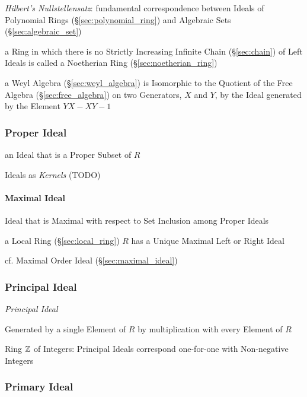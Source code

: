 \emph{Hilbert's Nullstellensatz}: fundamental correspondence between Ideals of
Polynomial Rings (\S\ref{sec:polynomial_ring}) and Algebraic Sets
(\S\ref{sec:algebraic_set})

a Ring in which there is no Strictly Increasing Infinite Chain
(\S\ref{sec:chain}) of Left Ideals is called a Noetherian Ring
(\S\ref{sec:noetherian_ring})

\fist a Weyl Algebra (\S\ref{sec:weyl_algebra}) is Isomorphic to the Quotient
of the Free Algebra (\S\ref{sec:free_algebra}) on two Generators, $X$ and $Y$,
by the Ideal generated by the Element $YX - XY - 1$



\subsubsection{Proper Ideal}\label{sec:proper_ideal}

an Ideal that is a Proper Subset of $R$

Ideals as \emph{Kernels} (TODO)



\paragraph{Maximal Ideal}\label{sec:maximal_ring_ideal}\hfill

Ideal that is Maximal with respect to Set Inclusion among Proper Ideals

a Local Ring (\S\ref{sec:local_ring}) $R$ has a Unique Maximal Left or Right
Ideal

cf. Maximal Order Ideal (\S\ref{sec:maximal_ideal})



\subsubsection{Principal Ideal}\label{sec:principal_ideal}

\emph{Principal Ideal}

Generated by a single Element of $R$ by multiplication with every
Element of $R$

Ring $\mathbb{Z}$ of Integers: Principal Ideals correspond one-for-one with
Non-negative Integers



\subsubsection{Primary Ideal}\label{sec:primary_ideal}

